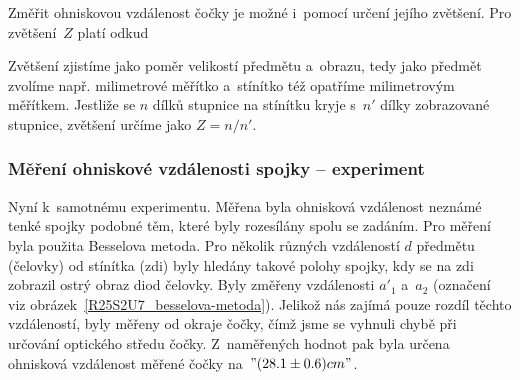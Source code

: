 {


Změřit ohniskovou vzdálenost čočky je možné i~pomocí určení jejího zvětšení. Pro zvětšení~$Z$ platí
odkud

Zvětšení zjistíme jako poměr velikostí předmětu a~obrazu, tedy jako předmět
zvolíme např. milimetrové měřítko a~stínítko též opatříme milimetrovým měřítkem.
Jestliže se $ n $ dílků stupnice na stínítku kryje s~$ n' $ dílky zobrazované
stupnice, zvětšení určíme jako $ Z = {n}/{n'} $.

\subsubsection{Měření ohniskové vzdálenosti spojky -- experiment}

Nyní k~samotnému experimentu. Měřena byla ohnisková vzdálenost neznámé tenké
spojky podobné těm, které byly rozesílány spolu se zadáním. Pro měření byla
použita Besselova metoda. Pro několik různých vzdáleností $ d $ předmětu
(čelovky) od stínítka (zdi) byly hledány takové polohy spojky, kdy se na zdi
zobrazil ostrý obraz diod čelovky. Byly změřeny vzdálenosti $ a'_1 $ a~$ a_2 $
(označení viz obrázek~\ref{R25S2U7_besselova-metoda}). Jelikož nás zajímá pouze
rozdíl těchto vzdáleností, byly měřeny od okraje čočky, čímž jsme se vyhnuli
chybě při určování optického středu čočky. Z~naměřených hodnot pak byla určena
ohnisková vzdálenost měřené čočky na~$"(28.1\pm0.6) cm"$.

}
